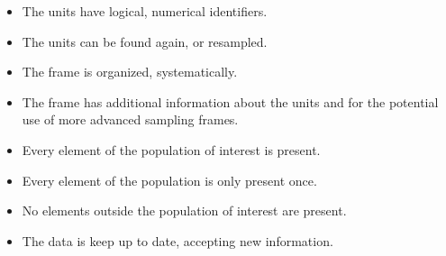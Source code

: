 \begin{itemize}
  \begin{itemize}
      \item The units have logical, numerical identifiers.
      \item The units can be found again, or resampled.
      \item The frame is organized, systematically.
      \item The frame has additional information about the units and for the potential use of more advanced sampling frames.
      \item Every element of the population of interest is present.
      \item Every element of the population is only present once.
      \item No elements outside the population of interest are present.
      \item The data is keep up to date, accepting new information.
  \end{itemize}


\end{itemize}
